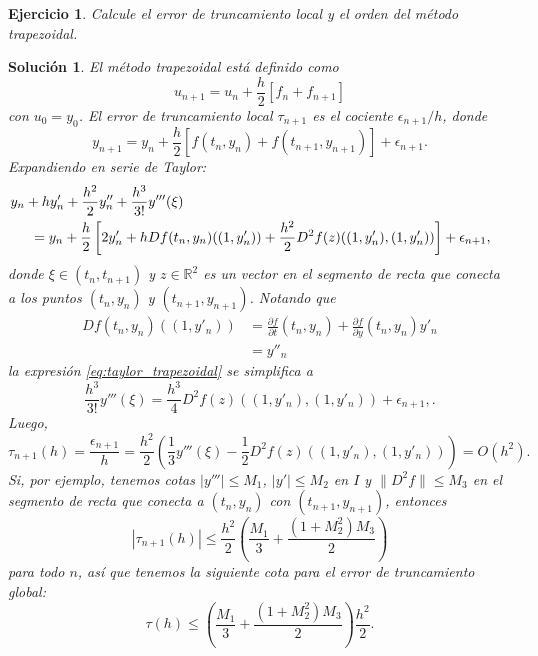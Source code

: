 \documentclass[11pt]{article}
\newtheorem{exercise}{Ejercicio}
\newtheorem*{sol}{Solución}
\newcommand\R{\mathbb R}
\begin{document}
\begin{exercise}
  Calcule el error de truncamiento local y el orden del método
  trapezoidal.
\end{exercise}
\begin{sol}
  El método trapezoidal está definido como
  \begin{equation}
    u_{n+1} = u_n + \frac{h}{2}[f_n + f_{n+1}]
  \end{equation}
  con $u_0=y_0$.
  El error de truncamiento local $\tau_{n+1}$ es el cociente
  $\epsilon_{n+1} / h$, donde
  \begin{equation}
    y_{n+1} = y_n + \frac{h}{2}[f(t_n,y_n)+f(t_{n+1},y_{n+1})] +
    \epsilon_{n+1}
  .\end{equation}
  Expandiendo en serie de Taylor:
  \begin{equation}\label{eq:taylor_trapezoidal}
    \begin{split}
    &\hspace{-5mm}
    y_{n}+hy'_n+\frac{h^{2}}{2}y''_n+\frac{h^{3}}{3!}y'''(\xi)
    \\
    &=
    y_n
    +
    \frac{h}{2} \left[
      2y'_n + h Df(t_n,y_n)((1,y'_n))
      + \frac{h^{2}}{2} D^{2}f(z)((1,y'_n),(1,y'_n))
    \right]
    + \epsilon_{n+1},
    \end{split}
  \end{equation}
  donde $\xi\in(t_n,t_{n+1})$ y $z\in\R^{2}$ es un vector en el
  segmento de recta que conecta a los puntos $(t_n,y_n)$ y
  $(t_{n+1},y_{n+1})$. Notando que
  \begin{align}
    Df(t_n,y_n)((1,y'_n))
    &= \frac{\partial f}{\partial t}(t_n,y_n)
    + \frac{\partial f}{\partial y}(t_n,y_n)y'_n \\
    &= y''_n
  \end{align}
  la expresión \eqref{eq:taylor_trapezoidal} se simplifica a
  \begin{equation}
    \frac{h^{3}}{3!}y'''(\xi)
    =
    \frac{h^{3}}{4} D^{2}f(z)((1,y'_n),(1,y'_n))
    + \epsilon_{n+1},
  .\end{equation}
  Luego,
  \begin{equation}
    \tau_{n+1}(h)
    =
    \frac{\epsilon_{n+1}}{h}
    =
    \frac{h^{2}}{2}
    \left(
      \frac{1}{3}y'''(\xi)
      -
      \frac{1}{2}D^{2}f(z)((1,y'_n),(1,y'_n))
    \right)
    = O(h^{2})
  .\end{equation}
  Si, por ejemplo, tenemos cotas
  $|y'''|\leq M_1$, $|y'|\leq M_2$ en $I$ y
  $\|D^{2}f\|\leq M_3$ en el segmento de recta que conecta a
  $(t_n,y_n)$ con $(t_{n+1},y_{n+1})$, entonces
  \begin{equation}
    |\tau_{n+1}(h)|\leq \frac{h^{2}}{2}
    \left(
      \frac{M_1}{3} + \frac{(1+M_2^{2})M_3}{2}
    \right)
  \end{equation}
  para todo $n$, así que tenemos la siguiente cota para el error de
  truncamiento global:
  \begin{equation}
    \tau(h)
    \leq
    \left( \frac{M_1}{3} + \frac{(1+M_2^{2})M_3}{2}  \right)
    \frac{h^{2}}{2}
  .\end{equation}
\end{sol}
\end{document}

